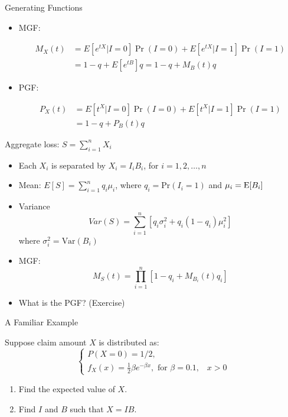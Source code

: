 \documentclass[11pt]{beamer}
\begin{document}
\begin{frame}{Generating Functions}
  
\begin{itemize}

\item MGF: 

\begin{align*}
M_X(t)&=E[e^{tX}|I=0]\Pr(I=0)+E[e^{tX}|I=1]\Pr(I=1) \\
&=1-q+E[e^{tB}]q=1-q+M_B(t)q
\end{align*}

\item PGF: 

\begin{align*}
P_X(t)&=E[t^X|I=0]\Pr(I=0)+E[t^X|I=1]\Pr(I=1) \\
  &=1-q+P_B(t)q
\end{align*}

\end{itemize}
  
\end{frame}
\begin{frame}{Aggregate loss: $S = \sum^n_{i=1} X_i$}
  \begin{itemize}
  \item Each $X_i$ is separated by $X_i = I_i B_i$, for $i = 1, 2, \ldots, n$
  \item Mean:
    $
    E[S] = \sum^n_{i=1} q_i \mu_i$, where $q_i = \mbox{Pr} (I_i = 1)$ and $\mu_i = {\mbox E} [ B_i ]$
  \item Variance $$Var(S)= \sum^n_{i=1} [q_i \sigma_i^2 + q_i (1 - q_i) \mu_i^2]$$
  where $\sigma_i^2 = \mbox {Var} (B_i)$
  \item MGF: $$M_S(t)=\prod^n_{i=1}[1-q_i+M_{B_i}(t)q_i]$$
  \item What is the PGF? (Exercise)
  \end{itemize}

\end{frame}
\begin{frame}{A Familiar Example}

Suppose claim amount $X$ is distributed as:
  $$\left\{\begin{array}{ll}P\left( X=0\right) =1/2, \\
      f_X(x) =\frac{1}{2}\beta e^{-\beta x}, \text{ for }\beta =0.1,\;\;\; x>0
    \end{array}\right.$$
  \begin{enumerate}
  \item Find the expected value of $X$.
  \item Find $I$ and $B$ such that $X=IB$.
  \end{enumerate}



\end{frame}
\end{document}
